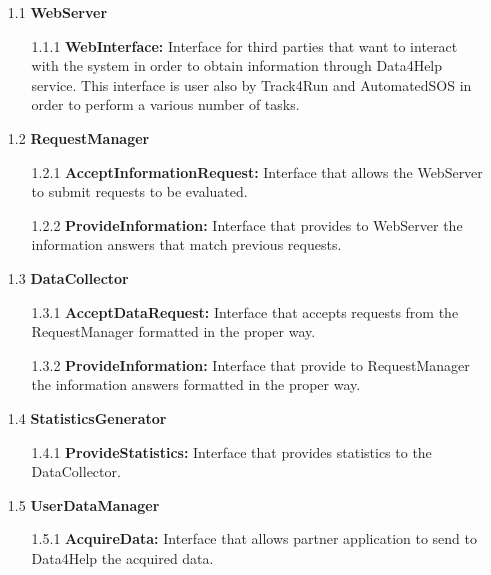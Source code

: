 \begin{center}
\begin{enumerate}
\item[1.1] \textbf{WebServer}
	\begin{enumerate}[nolistsep]
		\item[1.1.1] \textbf{WebInterface:} Interface for third parties that want to interact with the system in order to obtain information through Data4Help service. This interface is user also by Track4Run and AutomatedSOS in order to perform a various number of tasks.
	\end{enumerate}
	
\item[1.2] \textbf{RequestManager}
	\begin{enumerate}[nolistsep]
		\item[1.2.1] \textbf{AcceptInformationRequest:} Interface that allows the WebServer to submit requests to be evaluated.
		\item[1.2.2] \textbf{ProvideInformation:} Interface that provides to WebServer the information answers that match previous requests.
	\end{enumerate}

\item[1.3] \textbf{DataCollector}
	\begin{enumerate}[nolistsep]
		\item[1.3.1] \textbf{AcceptDataRequest:} Interface that accepts requests from the RequestManager formatted in the proper way.
		\item[1.3.2] \textbf{ProvideInformation:} Interface that provide to RequestManager the information answers formatted in the proper way.
	\end{enumerate}
	
\item[1.4] \textbf{StatisticsGenerator}
	\begin{enumerate}[nolistsep]
		\item[1.4.1] \textbf{ProvideStatistics:} Interface that provides statistics to the DataCollector.
	\end{enumerate}
	
\item[1.5] \textbf{UserDataManager}
	\begin{enumerate}[nolistsep]
		\item[1.5.1] \textbf{AcquireData:} Interface that allows partner application to send to Data4Help the acquired data.
	\end{enumerate}


\end{enumerate}
\end{center}
